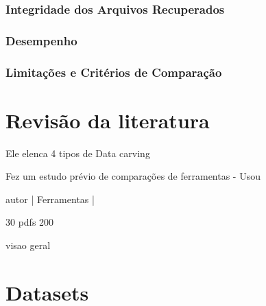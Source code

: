 \documentclass[cic,diss,portuguese]{infufrgs}
\begin{document}
\subsection{Integridade dos Arquivos Recuperados}

\subsection{Desempenho}

\subsection{Limitações e Critérios de Comparação}




\chapter{Revisão da literatura}

\cite{fulano}
Ele elenca 4 tipos de Data carving 

\cite{ciclano}
Fez um estudo prévio de comparações de ferramentas
  -  Usou 





 autor    | Ferramentas         | 
%

30 pdfs
200 

visao geral 




\chapter{Datasets}





\end{document}
